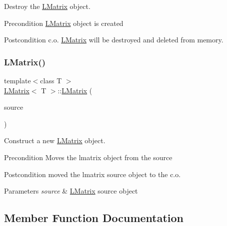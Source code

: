 Destroy the \mbox{\hyperlink{class_l_matrix}{L\+Matrix}} object. 

\begin{DoxyPrecond}{Precondition}
\mbox{\hyperlink{class_l_matrix}{L\+Matrix}} object is created 
\end{DoxyPrecond}
\begin{DoxyPostcond}{Postcondition}
c.\+o. \mbox{\hyperlink{class_l_matrix}{L\+Matrix}} will be destroyed and deleted from memory. 
\end{DoxyPostcond}
\mbox{\label{class_l_matrix_a30c31d51a4ee693b725d0acec95c430f}} 
\subsubsection{\texorpdfstring{LMatrix()}{LMatrix()}\hspace{0.1cm}{\footnotesize\ttfamily [5/5]}}
{\footnotesize\ttfamily template$<$class T $>$ \\
\mbox{\hyperlink{class_l_matrix}{L\+Matrix}}$<$ T $>$\+::\mbox{\hyperlink{class_l_matrix}{L\+Matrix}} (\begin{DoxyParamCaption}\item[{\mbox{\hyperlink{class_l_matrix}{L\+Matrix}}$<$ T $>$ \&\&}]{source }\end{DoxyParamCaption})}



Construct a new \mbox{\hyperlink{class_l_matrix}{L\+Matrix}} object. 

\begin{DoxyPrecond}{Precondition}
Moves the lmatrix object from the source 
\end{DoxyPrecond}
\begin{DoxyPostcond}{Postcondition}
moved the lmatrix source object to the c.\+o.
\end{DoxyPostcond}

\begin{DoxyParams}{Parameters}
{\em source} & \mbox{\hyperlink{class_l_matrix}{L\+Matrix}} source object \\
\hline
\end{DoxyParams}


\subsection{Member Function Documentation}
\mbox{\label{class_l_matrix_a20e109f3a40b550fd2c918e3c16d2cb7}} 
